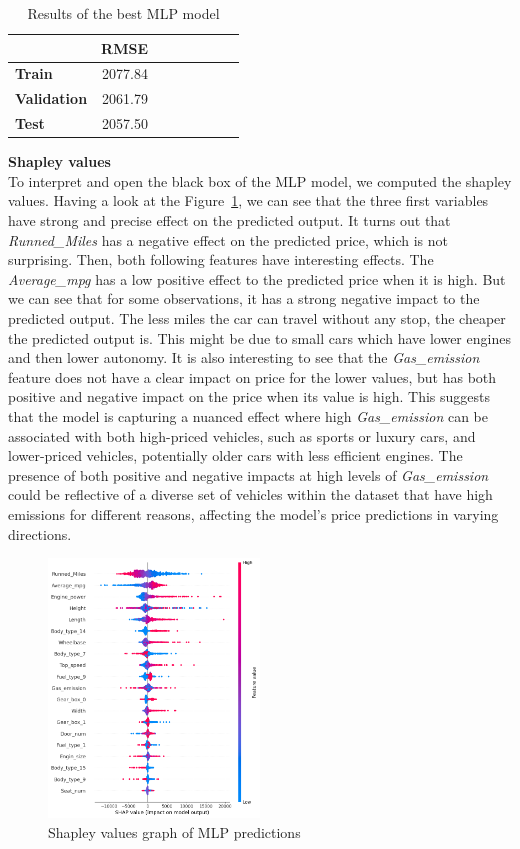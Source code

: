 \documentclass[12pt]{article}
\begin{document}
\FloatBarrier
\begin{table}[h]
    \centering
    \caption{Results of the best MLP model}
    \label{table:Results of the final MLP}

    \begin{tabular}{lrrrrrrr}
    \toprule
           & RMSE \\
    \midrule
    \textbf{Train} & 2077.84\\
    \textbf{Validation} & 2061.79\\
    \textbf{Test} & 2057.50\\
    \bottomrule
    \end{tabular}
\end{table}
\FloatBarrier

\noindent \textbf{Shapley values}\\
To interpret and open the black box of the MLP model, we computed the shapley values. Having a look at the Figure~\ref{shap MLP}, we can see that the three first variables have strong and precise effect on the predicted output. It turns out that \textit{Runned\_Miles} has a negative effect on the predicted price, which is not surprising. Then, both following features have interesting effects. 
The \textit{Average\_mpg} has a low positive effect to the predicted price when it is high. But we can see that for some observations, it has a strong negative impact to the predicted output. The less miles the car can travel without any stop, the cheaper the predicted output is. This might be due to small cars which have lower engines and then lower autonomy.
It is also interesting to see that the \textit{Gas\_emission} feature does not have a clear impact on price for the lower values, but has both positive and negative impact on the price when its value is high. This suggests that the model is capturing a nuanced effect where high \textit{Gas\_emission} can be associated with both high-priced vehicles, such as sports or luxury cars, and lower-priced vehicles, potentially older cars
with less efficient engines. The presence of both positive and negative impacts at high levels of \textit{Gas\_emission} could be reflective of a diverse set of vehicles within the dataset that have high emissions for different reasons, affecting the model's price predictions in varying directions.
\FloatBarrier
\begin{figure}[ht]
    \centering
    \includegraphics[width=0.5\textwidth]{shap MLP.png}
    \caption{Shapley values graph of MLP predictions}
    \label{shap MLP}
\end{figure}
\end{document}

